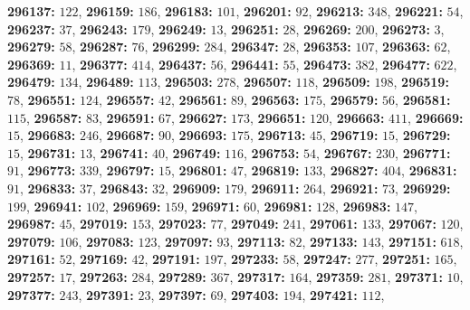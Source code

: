 \textsf{\bfseries 296137:} $122$, \textsf{\bfseries 296159:} $186$, \textsf{\bfseries 296183:} $101$, \textsf{\bfseries 296201:} $92$, \textsf{\bfseries 296213:} $348$, \textsf{\bfseries 296221:} $54$, \textsf{\bfseries 296237:} $37$, \textsf{\bfseries 296243:} $179$, \textsf{\bfseries 296249:} $13$, \textsf{\bfseries 296251:} $28$, \textsf{\bfseries 296269:} $200$, \textsf{\bfseries 296273:} $3$, \textsf{\bfseries 296279:} $58$, \textsf{\bfseries 296287:} $76$, \textsf{\bfseries 296299:} $284$, \textsf{\bfseries 296347:} $28$, \textsf{\bfseries 296353:} $107$, \textsf{\bfseries 296363:} $62$, \textsf{\bfseries 296369:} $11$, \textsf{\bfseries 296377:} $414$, \textsf{\bfseries 296437:} $56$, \textsf{\bfseries 296441:} $55$, \textsf{\bfseries 296473:} $382$, \textsf{\bfseries 296477:} $622$, \textsf{\bfseries 296479:} $134$, \textsf{\bfseries 296489:} $113$, \textsf{\bfseries 296503:} $278$, \textsf{\bfseries 296507:} $118$, \textsf{\bfseries 296509:} $198$, \textsf{\bfseries 296519:} $78$, \textsf{\bfseries 296551:} $124$, \textsf{\bfseries 296557:} $42$, \textsf{\bfseries 296561:} $89$, \textsf{\bfseries 296563:} $175$, \textsf{\bfseries 296579:} $56$, \textsf{\bfseries 296581:} $115$, \textsf{\bfseries 296587:} $83$, \textsf{\bfseries 296591:} $67$, \textsf{\bfseries 296627:} $173$, \textsf{\bfseries 296651:} $120$, \textsf{\bfseries 296663:} $411$, \textsf{\bfseries 296669:} $15$, \textsf{\bfseries 296683:} $246$, \textsf{\bfseries 296687:} $90$, \textsf{\bfseries 296693:} $175$, \textsf{\bfseries 296713:} $45$, \textsf{\bfseries 296719:} $15$, \textsf{\bfseries 296729:} $15$, \textsf{\bfseries 296731:} $13$, \textsf{\bfseries 296741:} $40$, \textsf{\bfseries 296749:} $116$, \textsf{\bfseries 296753:} $54$, \textsf{\bfseries 296767:} $230$, \textsf{\bfseries 296771:} $91$, \textsf{\bfseries 296773:} $339$, \textsf{\bfseries 296797:} $15$, \textsf{\bfseries 296801:} $47$, \textsf{\bfseries 296819:} $133$, \textsf{\bfseries 296827:} $404$, \textsf{\bfseries 296831:} $91$, \textsf{\bfseries 296833:} $37$, \textsf{\bfseries 296843:} $32$, \textsf{\bfseries 296909:} $179$, \textsf{\bfseries 296911:} $264$, \textsf{\bfseries 296921:} $73$, \textsf{\bfseries 296929:} $199$, \textsf{\bfseries 296941:} $102$, \textsf{\bfseries 296969:} $159$, \textsf{\bfseries 296971:} $60$, \textsf{\bfseries 296981:} $128$, \textsf{\bfseries 296983:} $147$, \textsf{\bfseries 296987:} $45$, \textsf{\bfseries 297019:} $153$, \textsf{\bfseries 297023:} $77$, \textsf{\bfseries 297049:} $241$, \textsf{\bfseries 297061:} $133$, \textsf{\bfseries 297067:} $120$, \textsf{\bfseries 297079:} $106$, \textsf{\bfseries 297083:} $123$, \textsf{\bfseries 297097:} $93$, \textsf{\bfseries 297113:} $82$, \textsf{\bfseries 297133:} $143$, \textsf{\bfseries 297151:} $618$, \textsf{\bfseries 297161:} $52$, \textsf{\bfseries 297169:} $42$, \textsf{\bfseries 297191:} $197$, \textsf{\bfseries 297233:} $58$, \textsf{\bfseries 297247:} $277$, \textsf{\bfseries 297251:} $165$, \textsf{\bfseries 297257:} $17$, \textsf{\bfseries 297263:} $284$, \textsf{\bfseries 297289:} $367$, \textsf{\bfseries 297317:} $164$, \textsf{\bfseries 297359:} $281$, \textsf{\bfseries 297371:} $10$, \textsf{\bfseries 297377:} $243$, \textsf{\bfseries 297391:} $23$, \textsf{\bfseries 297397:} $69$, \textsf{\bfseries 297403:} $194$, \textsf{\bfseries 297421:} $112$, 
